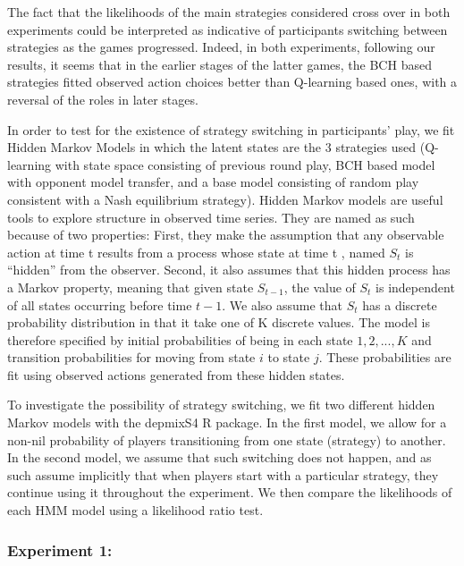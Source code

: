 \documentclass[man,floatsintext]{apa6}
\begin{document}
The fact that the likelihoods of the main strategies considered cross over in both experiments could be interpreted as indicative of participants switching between strategies as the games progressed. Indeed, in both experiments, following our results, it seems that in the earlier stages of the latter games, the BCH based strategies fitted observed action choices better than Q-learning based ones, with a reversal of the roles in later stages.

In order to test for the existence of strategy switching in participants' play, we fit Hidden Markov Models in which the latent states are the 3 strategies used (Q-learning with state space consisting of previous round play, BCH based model with opponent model transfer, and a base model consisting of random play consistent with a Nash equilibrium strategy). Hidden Markov models are useful tools to explore structure in observed time series. They are named as such because of two properties: First, they make the assumption that any observable action at time t results from a process whose state at time t , named \(S_{t}\) is \enquote{hidden} from the observer. Second, it also assumes that this hidden process has a Markov property, meaning that given state \(S_{t-1}\), the value of \(S_{t}\) is independent of all states occurring before time \(t-1\). We also assume that \(S_{t}\) has a discrete probability distribution in that it take one of K discrete values. The model is therefore specified by initial probabilities of being in each state \({1,2,...,K}\) and transition probabilities for moving from state \(i\) to state \(j\). These probabilities are fit using observed actions generated from these hidden states.

To investigate the possibility of strategy switching, we fit two different hidden Markov models with the depmixS4 R package. In the first model, we allow for a non-nil probability of players transitioning from one state (strategy) to another. In the second model, we assume that such switching does not happen, and as such assume implicitly that when players start with a particular strategy, they continue using it throughout the experiment. We then compare the likelihoods of each HMM model using a likelihood ratio test.

\hypertarget{experiment-1-1}{%
\subsubsection{Experiment 1:}\label{experiment-1-1}}
\end{document}
